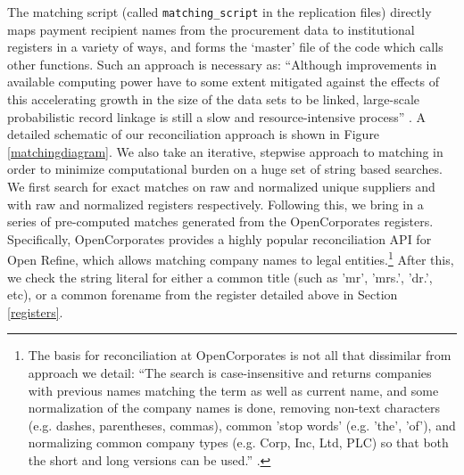 \documentclass[12pt]{article}
\begin{document}



The matching script (called \texttt{matching\_script} in the replication files) directly maps payment recipient names from the procurement data to institutional registers in a variety of ways, and forms the `master' file of the code which calls other functions. Such an approach is necessary as: ``Although improvements in available computing power have to some extent mitigated against the effects of this accelerating growth in the size of the data sets to be linked, large-scale probabilistic record linkage is still a slow and resource-intensive process'' \citep{Christen02parallelcomputing}.
A detailed schematic of our reconciliation approach is shown in Figure \ref{matchingdiagram}. We also take an iterative, stepwise approach to matching in order to minimize computational burden on a huge set of string based searches. We first search for exact matches on raw and normalized unique suppliers and with raw and normalized registers respectively. Following this, we bring in a series of pre-computed matches generated from the OpenCorporates registers. Specifically, OpenCorporates provides a highly popular reconciliation API for Open Refine, which allows matching company names to legal entities.\footnote{The basis for reconciliation at OpenCorporates is not all that dissimilar from approach we detail: ``The search is case-insensitive and returns companies with previous names matching the term as well as current name, and some normalization of the company names is done, removing non-text characters (e.g. dashes, parentheses, commas), common 'stop words' (e.g. 'the', 'of'), and normalizing common company types (e.g. Corp, Inc, Ltd, PLC) so that both the short and long versions can be used.'' \citep{OCref}.} After this, we check the string literal for either a common title (such as 'mr', 'mrs.', 'dr.', etc), or a common forename from the register detailed above in Section \ref{registers}.
\end{document}
